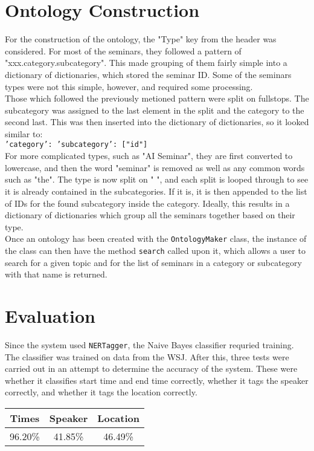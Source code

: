 \documentclass[10pt]{article}
\begin{document}
\begin{multicols}{2}
\section{Ontology Construction}
For the construction of the ontology, the "Type" key from the header was considered. For most of the seminars, they followed a pattern of "xxx.category.subcategory". This made grouping of them fairly simple into a dictionary of dictionaries, which stored the seminar ID. Some of the seminars types were not this simple, however, and required some processing.\\
Those which followed the previously metioned pattern were split on fullstops. The subcategory was assigned to the last element in the split and the category to the second last. This was then inserted into the dictionary of dictionaries, so it looked similar to:\\ {{\tt {'category': {'subcategory': ["id"]} } }}\\For more complicated types, such as "AI Seminar", they are first converted to lowercase, and then the word "seminar" is removed as well as any common words such as "the". The type is now split on " ", and each split is looped through to see it is already contained in the subcategories. If it is, it is then appended to the list of IDs for the found subcategory inside the category.
Ideally, this results in a dictionary of dictionaries which group all the seminars together based on their type.
\\Once an ontology has been created with the {{\tt OntologyMaker}} class, the instance of the class can then have the method {{\tt search}} called upon it, which allows a user to search for a given topic and for the list of seminars in a category or subcategory with that name is returned.
\section{Evaluation}
Since the system used {{\tt NERTagger}}, the Naive Bayes classifier requried training. The classifier was trained on data from the WSJ. After this, three tests were carried out in an attempt to determine the accuracy of the system. These were whether it classifies start time and end time correctly, whether it tags the speaker correctly, and whether it tags the location correctly.\\
\begin{center}
  \begin{tabular}{| c | c | c |}
    \hline
    Times & Speaker & Location \\ \hline
    96.20\% & 41.85\% & 46.49\% \\ 
    \hline
  \end{tabular}
\end{center}


\end{multicols}
\end{document}
